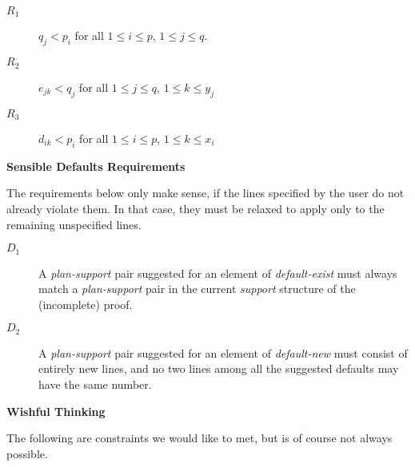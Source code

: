 \begin{description}
\item [$R_{1}$ ]  $q_j < p_i$ for all $1\leq i \leq p$, $1\leq j \leq q$.

\item [$R_{2}$ ]  $e_{jk} < q_j$ for all $1\leq j \leq q$, $1\leq k \leq y_j$

\item [$R_{3}$ ]  $d_{ik} < p_i$ for all $1 \leq i \leq p$, $1\leq k \leq x_i$
\end{description}

\begin{center}
{\bf Sensible Defaults Requirements}
\end{center}

The requirements below only make sense, if the lines specified by the user
do not already violate them.  In that case, they must be relaxed to
apply only to the remaining unspecified lines.
\begin{description}
\item [$D_{1}$ ]  A {\it plan-support} pair suggested for an element of {\it default-exist}
must always match a {\it plan-support} pair in the current {\it support} structure
of the (incomplete) proof.

\item [$D_{2}$ ]  A {\it plan-support} pair suggested for an element of {\it default-new}
must consist of entirely new lines, and no two lines among all the suggested
defaults may have the same number.
\end{description}

\begin{center}
{\bf Wishful Thinking}
\end{center}

The following are constraints we would like to met, but is of course
not always possible.

